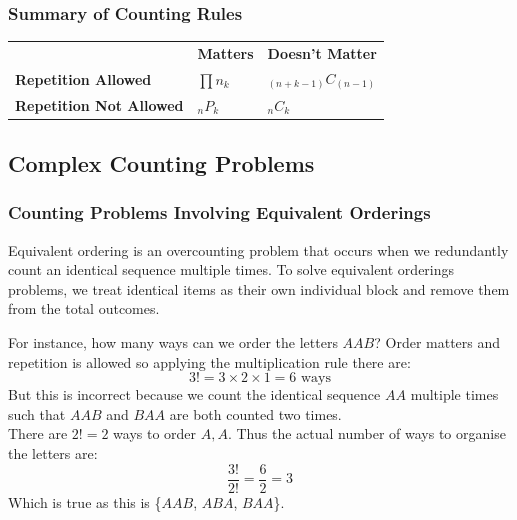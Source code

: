 \documentclass[12pt]{article}
\theoremstyle{definition}
\begin{document}
    \subsubsection{Summary of Counting Rules}
    \begin{center}
    \renewcommand{\arraystretch}{2} %
    \begin{tabular}{|>{\centering\arraybackslash}m{4cm}
                    |>{\centering\arraybackslash}m{4cm}
                    |>{\centering\arraybackslash}m{4cm}|}
        \hline
        & \multicolumn{2}{c|}{\textbf{Order}} \\ \cline{2-3}
        & \textbf{Matters} & \textbf{Doesn't Matter} \\
        \hline
        \textbf{Repetition Allowed} & 
        $\prod n_k$ &
        $_{(n+k-1)}C_{(n-1)}$\\
        \hline
        \textbf{Repetition Not Allowed} &
        $_nP_k$ &
        $_nC_k$ \\
        \hline
    \end{tabular}
    \end{center}

    \newpage
    \subsection{Complex Counting Problems}
    \subsubsection{Counting Problems Involving Equivalent Orderings}
    Equivalent ordering is an overcounting problem that occurs when we redundantly count an identical sequence
    multiple times. To solve equivalent orderings problems, we treat identical items as their own individual block
    and remove them from the total outcomes. \\

    \begin{example}
        For instance, how many ways can we order the letters $AAB$? Order matters and repetition is allowed
        so applying the multiplication rule there are:
        \begin{equation*}
            3! = 3 \times 2 \times 1 = 6 \text{ ways}
        \end{equation*}
        But this is incorrect because we count the identical sequence $AA$ multiple times such that $AAB$ and $BAA$
        are both counted two times. \\

        There are $2! = 2$ ways to order $A, A$. Thus the actual number of ways to organise the letters are:
        \begin{equation*}
            \frac{3!}{2!} = \frac{6}{2} = 3
        \end{equation*}
        Which is true as this is \{$AAB$, $ABA$, $BAA$\}.
    \end{example}
\end{document}
